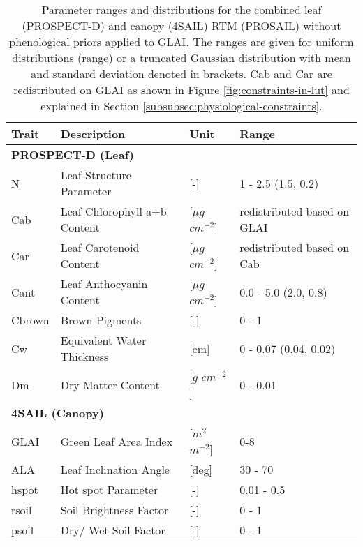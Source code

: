 \begin{table}[H]
\centering
\caption{Parameter ranges and distributions for the combined leaf (PROSPECT-D) and canopy (4SAIL) \gls{RTM} (PROSAIL) without phenological priors applied to GLAI. The ranges are given for uniform distributions (range) or a truncated Gaussian distribution with mean and standard deviation denoted in brackets. \gls{Cab} and Car are redistributed on \gls{GLAI} as shown in Figure \ref{fig:constraints-in-lut} and explained in Section \ref{subsubsec:physiological-constraints}.}
\label{tab:prosail-inputs}
\begin{tabular}{@{}lllllll@{}}
\toprule
  \textbf{Trait}     & \textbf{Description}         & \textbf{Unit}           & \multicolumn{4}{l}{\textbf{Range}}              \\ \midrule
\multicolumn{7}{l}{\textbf{PROSPECT-D (Leaf)}}                                                                \\
\midrule
N      & Leaf Structure Parameter     & {[}-{]}                 & \multicolumn{4}{l}{1 - 2.5 (1.5, 0.2)}          \\
Cab    & Leaf Chlorophyll a+b Content & {[}$\mu g$ $cm^{-2}${]} & \multicolumn{4}{l}{redistributed based on GLAI} \\
Car    & Leaf Carotenoid Content      & {[}$\mu g$ $cm^{-2}${]} & \multicolumn{4}{l}{redistributed based on Cab}  \\
Cant   & Leaf Anthocyanin Content     & {[}$\mu g$ $cm^{-2}${]} & \multicolumn{4}{l}{0.0 - 5.0 (2.0, 0.8)}        \\
Cbrown & Brown Pigments               & {[}-{]}                 & \multicolumn{4}{l}{0 - 1}                       \\
Cw     & Equivalent Water Thickness   & {[}cm{]}                & \multicolumn{4}{l}{0 - 0.07 (0.04, 0.02)}       \\
Dm     & Dry Matter Content           & {[}$g$ $cm^{-2}${]}     & \multicolumn{4}{l}{0 - 0.01}                    \\
\midrule
\multicolumn{7}{l}{\textbf{4SAIL (Canopy)}}                                                                     \\
\midrule
GLAI   & Green Leaf Area Index        & {[}$m^2$ $m^{-2}${]}    & \multicolumn{4}{l}{0-8}                         \\
ALA    & Leaf Inclination Angle       & {[}deg{]}               & \multicolumn{4}{l}{30 - 70}                     \\
hspot  & Hot spot Parameter           & {[}-{]}                 & \multicolumn{4}{l}{0.01 - 0.5}                  \\
rsoil  & Soil Brightness Factor       & {[}-{]}                 & \multicolumn{4}{l}{0 - 1}                       \\
psoil  & Dry/ Wet Soil Factor         & {[}-{]}                 & \multicolumn{4}{l}{0 - 1}                       \\ \bottomrule
\end{tabular}
\end{table}

